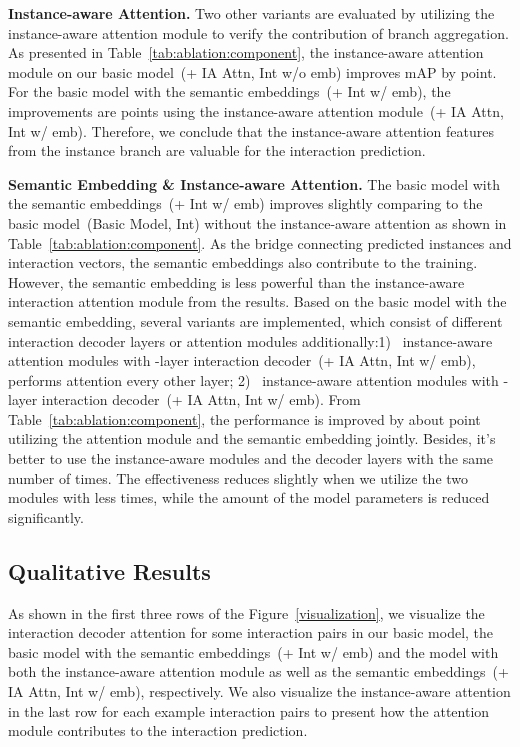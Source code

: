 \documentclass[final]{cvpr}
\begin{document}
\vspace{0.5mm}\noindent\textbf{Instance-aware Attention.}
Two other variants are evaluated by utilizing the instance-aware attention module to verify the contribution of branch aggregation. As presented in Table~\ref{tab:ablation:component}, the instance-aware attention module on our basic model~(+ IA Attn, Int w/o emb) improves mAP by  point. For the basic model with the semantic embeddings~(+ Int w/ emb), the improvements are  points using the instance-aware attention module~(+ IA Attn, Int w/ emb). Therefore, we conclude that the instance-aware attention features from the instance branch are valuable for the interaction prediction. 

\vspace{0.5mm}\noindent\textbf{Semantic Embedding \& Instance-aware Attention.}
The basic model with the semantic embeddings~(+ Int w/ emb) improves slightly comparing to the basic model~(Basic Model, Int) without the instance-aware attention as shown in Table~\ref{tab:ablation:component}. As the bridge connecting predicted instances and interaction vectors, the semantic embeddings also contribute to the training. However, the semantic embedding is less powerful than the instance-aware interaction attention module from the results. Based on the basic model with the semantic embedding, several variants are implemented, which consist of different interaction decoder layers or attention modules additionally:1)~ instance-aware attention modules with -layer interaction decoder~(+ IA Attn, Int w/ emb), performs attention every other layer; 2)~ instance-aware attention modules with -layer interaction decoder~(+ IA Attn, Int w/ emb). From Table~\ref{tab:ablation:component}, the performance is improved by about  point utilizing the attention module and the semantic embedding jointly. Besides, it's better to use the instance-aware modules and the decoder layers with the same number of times. The effectiveness reduces slightly when we utilize the two modules with less times, while the amount of the model parameters is reduced significantly.
\vspace{-1.5mm}\subsection{Qualitative Results}
\vspace{-1mm}
As shown in the first three rows of the Figure~\ref{visualization}, we visualize the interaction decoder attention for some interaction pairs in our basic model, the basic model with the semantic embeddings~(+ Int w/ emb) and the model with both the instance-aware attention module as well as the semantic embeddings~(+ IA Attn, Int w/ emb), respectively. We also visualize the instance-aware attention in the last row for each example interaction pairs to present how the attention module contributes to the interaction prediction. 
\end{document}
